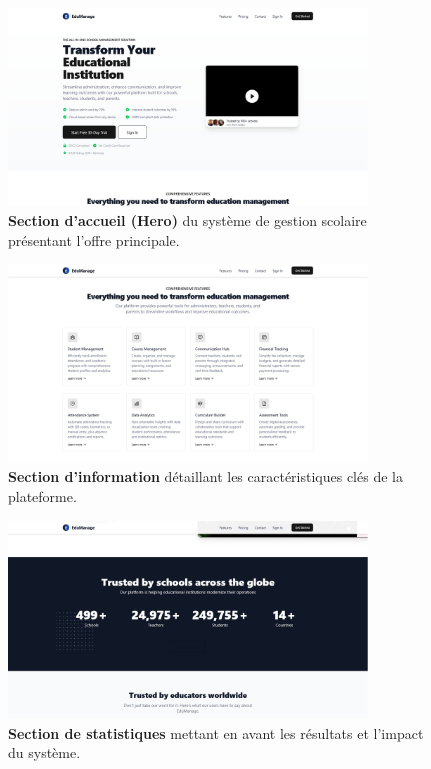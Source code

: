 \begin{figure}[H]
  \centering
  \includegraphics[width=0.85\textwidth,keepaspectratio]{pfe-pics/landing/hero.png}
  \caption{\textbf{Section d'accueil (Hero)} du système de gestion scolaire présentant l'offre principale.}
  \label{fig:landing_hero}
\end{figure}

\begin{figure}[H]
  \centering
  \includegraphics[width=0.85\textwidth,keepaspectratio]{pfe-pics/landing/info.png}
  \caption{\textbf{Section d'information} détaillant les caractéristiques clés de la plateforme.}
  \label{fig:landing_info}
\end{figure}

\begin{figure}[H]
  \centering
  \includegraphics[width=0.85\textwidth,keepaspectratio]{pfe-pics/landing/stats.png}
  \caption{\textbf{Section de statistiques} mettant en avant les résultats et l'impact du système.}
  \label{fig:landing_stats}
\end{figure}

